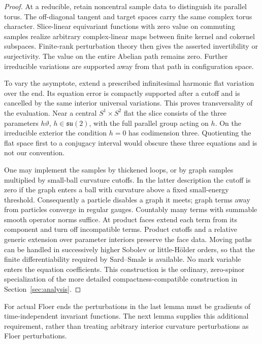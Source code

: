 \begin{proof}
At a reducible, retain noncentral sample data to distinguish its
parallel torus.  The off-diagonal tangent and target spaces carry
the same complex torus character.  Slice-linear equivariant
functions with zero value on commuting samples realize arbitrary
complex-linear maps between finite kernel and cokernel subspaces.
Finite-rank perturbation theory then gives the asserted invertibility
or surjectivity.  The value on the entire Abelian path remains zero.
Further irreducible variations are supported away from that path in
configuration space.

To vary the asymptote, extend a prescribed infinitesimal harmonic
flat variation over the end.  Its equation error is compactly
supported after a cutoff and is cancelled by the same interior
universal variations.  This proves transversality of the evaluation.
Near a central $S^1\times S^2$ flat the slice consists of the three
parameters $h\vartheta$, $h\in\mathfrak{su}(2)$, with the full
parallel group acting on $h$.  On the irreducible exterior the
condition $h=0$ has codimension three.  Quotienting the flat space
first to a conjugacy interval would obscure these three equations
and is not our convention.

One may implement the samples by thickened loops, or by graph
samples multiplied by small-ball curvature cutoffs.  In the latter
description the cutoff is zero if the graph enters a ball with
curvature above a fixed small-energy threshold.  Consequently a
particle disables a graph it meets; graph terms away from particles
converge in regular gauges.  Countably many terms with summable
smooth operator norms suffice.  At product faces extend each term
from its component and turn off incompatible terms.  Product
cutoffs and a relative generic extension over parameter interiors
preserve the face data.  Moving paths can be handled in successively
higher Sobolev or little-H\"older orders, so that the finite
differentiability required by Sard--Smale is available.  No mark
variable enters the equation coefficients.  This construction is
the ordinary, zero-spinor specialization of the more detailed
compactness-compatible construction in
Section~\ref{sec:analysis}.
\end{proof}

For actual Floer ends the perturbations in the last lemma must be
gradients of time-independent invariant functions.  The next lemma
supplies this additional requirement, rather than treating arbitrary
interior curvature perturbations as Floer perturbations.

